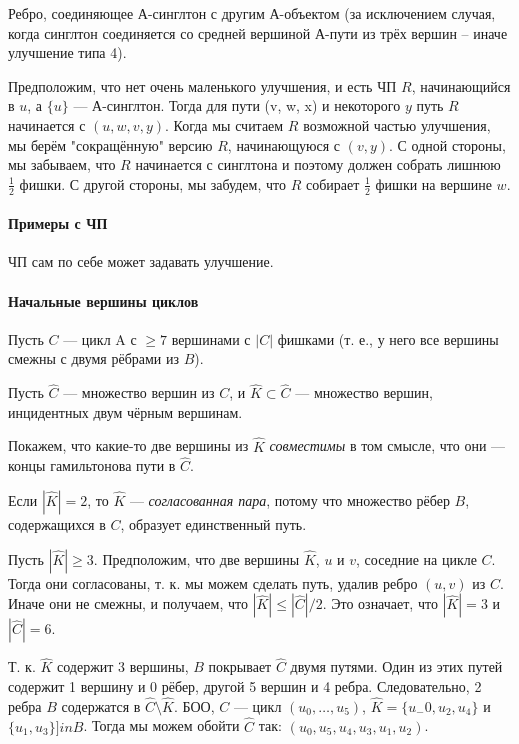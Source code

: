 Ребро, соединяющее А-синглтон с другим А-объектом (за исключением случая, когда синглтон соединяется со средней вершиной А-пути из трёх вершин -- иначе улучшение типа 4).

Предположим, что нет очень маленького улучшения, и есть ЧП $R$, начинающийся в $u$, а $\{u\}$ --- А-синглтон. Тогда для пути (v, w, x) и некоторого $y$ путь $R$ начинается с $(u, w, v, y)$. Когда мы считаем $R$ возможной частью улучшения, мы берём "сокращённую" версию $R$, начинающуюся с $(v, y)$. С одной стороны, мы забываем, что $R$ начинается с синглтона и поэтому должен собрать лишнюю $\frac{1}{2}$ фишки. С другой стороны, мы забудем, что $R$ собирает $\frac{1}{2}$ фишки на вершине $w$.

\paragraph{Примеры с ЧП}
ЧП сам по себе может задавать улучшение. 

\paragraph{Начальные вершины циклов}
Пусть $C$ --- цикл A с $\ge 7$ вершинами с $|C|$ фишками (т. е., у него все вершины смежны с двумя рёбрами из $B$).

Пусть $\hat{C}$ --- множество вершин из $C$, и $\hat{K} \subset \hat{C}$ --- множество вершин, инцидентных двум чёрным вершинам. 

Покажем, что какие-то две вершины из $\hat{K}$ \textit{совместимы} в том смысле, что они --- концы гамильтонова пути в $\hat{C}$.

Если $|\hat{K}| = 2$, то $\hat{K}$ --- \textit{согласованная пара}, потому что множество рёбер $B$, содержащихся в $C$, образует единственный путь.

Пусть $|\hat{K}| \ge 3$. 
Предположим, что две вершины $\hat{K}$, $u$ и $v$, соседние на цикле $C$. Тогда они согласованы, т. к. мы можем сделать путь, удалив ребро $(u, v)$ из $C$.
Иначе они не смежны, и получаем, что $|\hat{K}| \le |\hat{C}|/2$. Это означает, что $|\hat{K}| = 3$ и $|\hat{C}| = 6$.

Т. к. $\hat{K}$ содержит 3 вершины, $B$ покрывает $\hat{C}$ двумя путями. Один из этих путей содержит 1 вершину и 0 рёбер, другой 5 вершин и 4 ребра. Следовательно, 2 ребра $B$ содержатся в $\hat{C} \setminus \hat{K}$. БОО, $C$ --- цикл $(u_0, \dots, u_5)$, $\hat{K} = \{u_-0, u_2, u_4\}$ и $\{u_1, u_3\} ]in B$. Тогда мы можем обойти $\hat{C}$ так: $(u_0, u_5, u_4, u_3, u_1, u_2)$.

